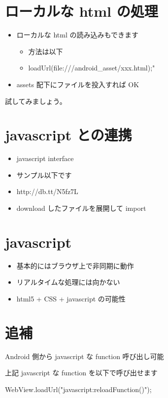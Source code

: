 \documentclass[slide,papersize]{jsarticle}
\begin{document}
\section*{ローカルな html の処理}
\medskip
\begin{itemize}
\item ローカルな html の読み込みもできます
 \begin{itemize}
 \medskip
 \item 方法は以下
 \item {\footnotesize loadUrl(file:///android\_asset/xxx.html);"}
 \end{itemize}
\medskip
\item assets 配下にファイルを投入すれば OK
\end{itemize}
試してみましょう。

\section*{javascript との連携}
\bigskip
\begin{itemize}
\item javascript interface
\bigskip
\item サンプル以下です
\bigskip
\item http://db.tt/N5fz7L
\bigskip
\item download したファイルを展開して import
\end{itemize}

\section*{javascript}
\bigskip
\begin{itemize}
\item 基本的にはブラウザ上で非同期に動作
\bigskip
\item リアルタイムな処理には向かない
\bigskip
\item html5 + CSS + javascript の可能性
\end{itemize}

\section*{追補}
{\footnotesize Android 側から javascript な function 呼び出し可能}
{\tiny
\begin{verbatimtab}
<script type="text/javascript">

  function reloadFunction() {
\end{verbatimtab}
}
{\footnotesize 上記 javascript な function を以下で呼び出せます}
{\tiny
\begin{verbatimtab}
  WebView.loadUrl("javascript:reloadFunction()");
\end{verbatimtab}
}
\end{document}
